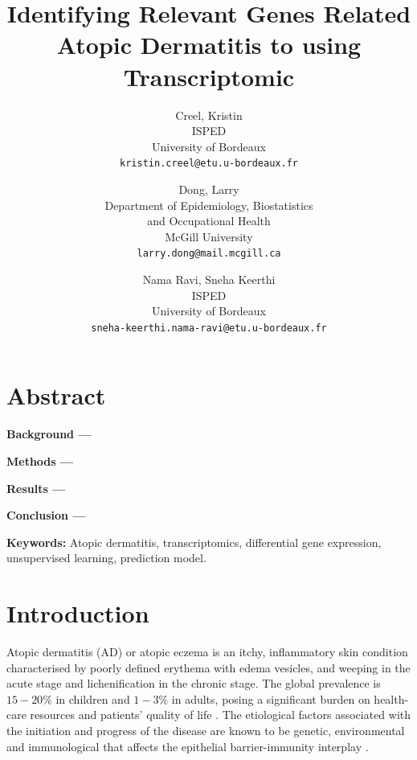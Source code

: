 \documentclass[journal, a4paper]{IEEEtran}
\begin{document}
\title{\Large{Identifying Relevant Genes Related Atopic Dermatitis  to  using Transcriptomic}}
\author{%
\begin{tabular}{c} Creel, Kristin \\ ISPED \\ University of Bordeaux \\ \texttt{kristin.creel@etu.u-bordeaux.fr} \end{tabular} \and
\begin{tabular}{c} Dong, Larry \\ Department of Epidemiology, Biostatistics \\ and Occupational Health \\ McGill University \\ \texttt{larry.dong@mail.mcgill.ca} \end{tabular} \and
\begin{tabular}{c} Nama Ravi, Sneha Keerthi \\ ISPED \\ University of Bordeaux \\ \texttt{sneha-keerthi.nama-ravi@etu.u-bordeaux.fr} \end{tabular}}
\maketitle





\section*{Abstract}

\textbf{Background --- }

\textbf{Methods ---} 

\textbf{Results ---} 

\textbf{Conclusion ---}

\textbf{Keywords:} Atopic dermatitis, transcriptomics, differential gene expression, unsupervised learning, prediction model.

\section{Introduction}

Atopic dermatitis (AD) or atopic eczema is an itchy, inflammatory skin condition characterised by poorly defined erythema with edema vesicles, and weeping in the acute stage and lichenification in the chronic stage. The global prevalence is $15-20 \%$ in children and $1-3\%$ in adults, posing a significant burden on health-care resources and patients’ quality of life \cite{nutten2015atopic}. The etiological factors associated with the initiation and progress of the disease are known to be genetic, environmental and immunological that affects the epithelial barrier-immunity interplay \cite{peng2015pathogenesis}.\\
\end{document}
